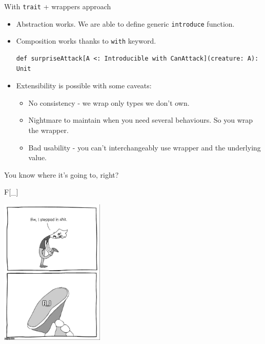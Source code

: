 \documentclass[presentation,aspectratio=169,smaller]{beamer}
\begin{document}
\begin{frame}[label={sec:org695f47c},fragile]{With \texttt{trait} + wrappers approach}
 \begin{itemize}
\item Abstraction works. We are able to define generic \texttt{introduce} function.
\item Composition works thanks to \texttt{with} keyword.
\begin{verbatim}
def surpriseAttack[A <: Introducible with CanAttack](creature: A): Unit
\end{verbatim}
\item Extensibility is possible with some caveats:
\begin{itemize}
\item No consistency - we wrap only types we don't own.
\item Nightmare to maintain when you need several behaviours. So you wrap the
wrapper.
\item Bad usability - you can’t interchangeably use wrapper and the underlying
value.
\end{itemize}
\end{itemize}

\pause

You know where it’s going to, right?
\end{frame}

\begin{frame}[label={sec:org5c05842}]{F[\_]}
\begin{center}
\includegraphics[height=7cm]{images/f_.jpg}
\end{center}
\end{frame}
\end{document}
